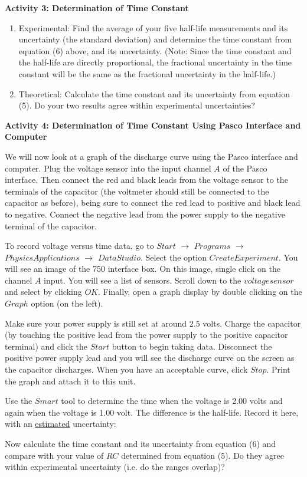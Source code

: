 \textbf{Activity 3: Determination of Time Constant}

\begin{enumerate}
\item Experimental:  Find the average of your five half-life measurements and 
its uncertainty (the standard deviation) and determine the time constant from 
equation (6) above, and its uncertainty. (Note: Since the time constant and the 
half-life are directly proportional, the fractional uncertainty in the time 
constant will be the same as the fractional uncertainty in the half-life.)
\vspace{40mm}
\item Theoretical:  Calculate the time constant and its uncertainty from 
equation (5). Do your two results agree within experimental uncertainties?
\end{enumerate}

\newpage

\textbf{Activity 4: Determination of Time Constant Using Pasco Interface and Computer}

We will now look at a graph of the discharge curve using the Pasco interface 
and computer. Plug the voltage sensor into the input channel $A$ of the Pasco 
interface. Then connect the red and black leads from the voltage sensor to the 
terminals of the capacitor (the voltmeter should still be connected to the 
capacitor as before), being sure to connect the red lead to positive and black 
lead to negative. Connect the negative lead from the power supply to the 
negative terminal of the capacitor.
\vspace{10mm}

To record voltage versus time data, go to $Start$ $\rightarrow$ $Programs$ 
$\rightarrow$ $Physics Applications$ $\rightarrow$ $Data Studio$. Select the 
option $Create Experiment$. You will see an image of the 750 interface box. 
On this image, single click on the channel $A$ input. You will see a list of 
sensors. Scroll down to the $voltage sensor$ and select by clicking $OK$. 
Finally, open a graph display by double clicking on the $Graph$ option (on 
the left).
\vspace{10mm}

Make sure your power supply is still set at around 2.5 volts. Charge the 
capacitor (by touching the positive lead from the power supply to the positive 
capacitor terminal) and click the $Start$ button to begin taking data. 
Disconnect the positive power supply lead and you will see the 
discharge curve on the screen as the capacitor discharges. When you have an 
acceptable curve, click $Stop$. Print the graph and attach it to this unit.
\vspace{10mm}

Use the $Smart$ tool to determine the time when the voltage is 2.00 volts 
and again when the voltage is 1.00 volt. The difference is the half-life. 
Record it here, with an \underline{estimated} uncertainty:
\vspace{40mm}

Now calculate the time constant and its uncertainty from equation (6) and 
compare with your value of $RC$ determined from equation (5). Do they agree 
within experimental uncertainty (i.e. do the ranges overlap)?

